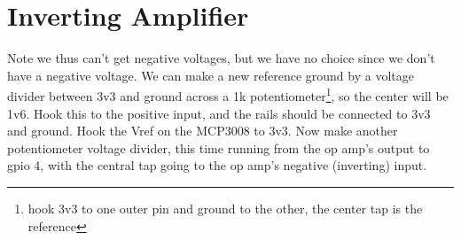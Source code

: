 \section{Inverting Amplifier}

Note we thus can't get negative voltages, but we have no choice since we don't have a negative voltage.  We can make a new reference ground by a voltage divider between 3v3 and ground across a 1k potentiometer\footnote{hook 3v3 to one outer pin and ground to the other, the center tap is the reference}, so the center will be 1v6.  Hook this to the positive input, and the rails should be connected to 3v3 and ground.  Hook the Vref on the MCP3008 to 3v3.  Now make another potentiometer voltage divider, this time running from the op amp's output to gpio 4, with the central tap going to the op amp's negative (inverting) input.



